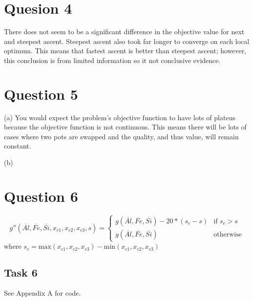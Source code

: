 \documentclass{article}
\begin{document}
\section{Quesion 4}
There does not seem to be a significant difference in the objective
value for next and steepest ascent. Steepest ascent also took far
longer to converge on each local optimum. This means that fastest
ascent is better than steepest ascent; however, this conclusion is from
limited information so it not conclusive evidence.

\section{Question 5}
(a) You would expect the problem's objective function to have lots of 
plateus because the objective function is not continuous. This means
there will be lots of cases where two pots are swapped and the
quality, and thus value, will remain constant.

\noindent (b) 

\section{Question 6}
$$g''(\overline{Al}, \overline{Fe}, \overline{Si}, x_{c1}, x_{c2}, 
x_{c3}, s) =
\begin{cases}
    g(\overline{Al}, \overline{Fe}, \overline{Si}) - 20*(s_c - s) & \text{if } s_c > s \\
    g(\overline{Al}, \overline{Fe}, \overline{Si}) & \text{otherwise}
\end{cases}$$ where
$s_c = \text{max}(x_{c1}, x_{c2}, x_{c3}) - \text{min}(x_{c1}, x_{c2}, x_{c3})$


\subsection{Task 6}
See Appendix A for code.
\end{document}
